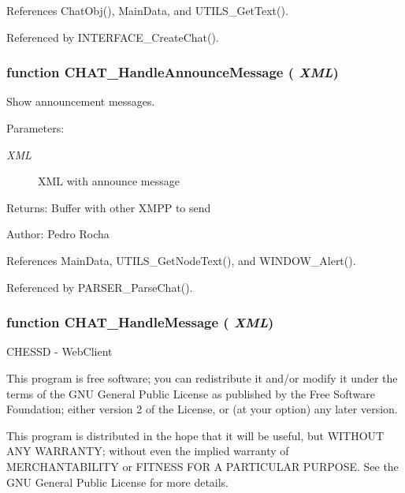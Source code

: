 References ChatObj(), MainData, and UTILS\_\-GetText().

Referenced by INTERFACE\_\-CreateChat().
\subsubsection[CHAT\_\-HandleAnnounceMessage]{\setlength{\rightskip}{0pt plus 5cm}function CHAT\_\-HandleAnnounceMessage ( {\em XML})}\label{chat_2chat_8js_615cd2e1ca89c4ebdf2708271d41f68d}


Show announcement messages. 

\begin{Desc}
\item[Parameters:]
\begin{description}
\item[{\em XML}]XML with announce message \end{description}
\end{Desc}
\begin{Desc}
\item[Returns:]Buffer with other XMPP to send \end{Desc}
\begin{Desc}
\item[Author:]Pedro Rocha \end{Desc}


References MainData, UTILS\_\-GetNodeText(), and WINDOW\_\-Alert().

Referenced by PARSER\_\-ParseChat().
\subsubsection[CHAT\_\-HandleMessage]{\setlength{\rightskip}{0pt plus 5cm}function CHAT\_\-HandleMessage ( {\em XML})}\label{chat_2chat_8js_1aabd0a9c0e5dd585f17ef11a3fa91ab}


CHESSD - WebClient

This program is free software; you can redistribute it and/or modify it under the terms of the GNU General Public License as published by the Free Software Foundation; either version 2 of the License, or (at your option) any later version.

This program is distributed in the hope that it will be useful, but WITHOUT ANY WARRANTY; without even the implied warranty of MERCHANTABILITY or FITNESS FOR A PARTICULAR PURPOSE. See the GNU General Public License for more details.

